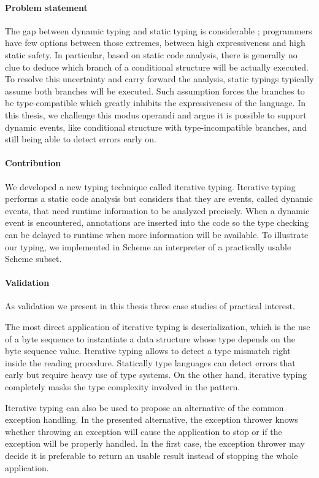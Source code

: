 \documentclass[a4paper]{report}
\begin{document}
\paragraph{Problem statement} The gap between dynamic typing and static typing is considerable ; programmers have few options between those extremes, between high expressiveness and high static safety. In particular, based on static code analysis, there is generally no clue to deduce which branch of a conditional structure will be actually executed. To resolve this uncertainty and carry forward the analysis, static typings typically assume both branches will be executed. Such assumption forces the branches to be type-compatible which greatly inhibits the expressiveness of the language. In this thesis, we challenge this modus operandi and argue it is possible to support dynamic events, like conditional structure with type-incompatible branches, and still being able to detect errors early on.

\paragraph{Contribution} We developed a new typing technique called iterative typing. Iterative typing performs a static code analysis but considers that they are events, called dynamic events, that need runtime information to be analyzed precisely. When a dynamic event is encountered, annotations are inserted into the code so the type checking can be delayed to runtime when more information will be available. To illustrate our typing, we implemented in Scheme an interpreter of a practically usable Scheme subset.

\paragraph{Validation} As validation we present in this thesis three case studies of practical interest.

The most direct application of iterative typing is deserialization, which is the use of a byte sequence to instantiate a data structure whose type depends on the byte sequence value. Iterative typing allows to detect a type mismatch right inside the reading procedure. Statically type languages can detect errors that early but require heavy use of type systems. On the other hand, iterative typing completely masks the type complexity involved in the pattern.

Iterative typing can also be used to propose an alternative of the common exception handling. In the presented alternative, the exception thrower knows whether throwing an exception will cause the application to stop or if the exception will be properly handled. In the first case, the exception thrower may decide it is preferable to return an usable result instead of stopping the whole application.
\end{document}
